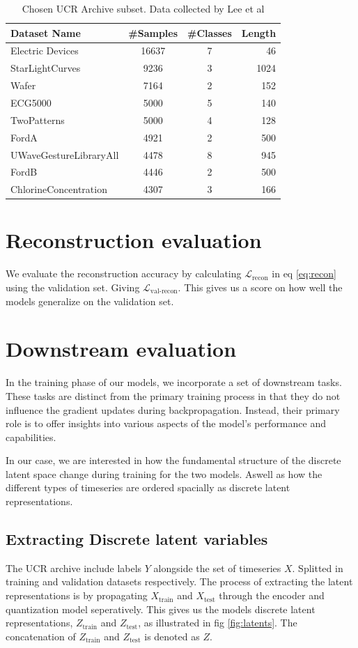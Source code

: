\begin{table}[h]
    \centering
    \begin{tabular}{l c c r}
    \hline
    Dataset Name & \#Samples & \#Classes & Length \\
    \hline
    Electric Devices & 16637 & 7 & 46 \\
    StarLightCurves & 9236 & 3 & 1024 \\
    Wafer & 7164 & 2 & 152\\
    ECG5000 & 5000 & 5 & 140 \\
    TwoPatterns & 5000 & 4 & 128 \\
    FordA & 4921 & 2 & 500 \\
    UWaveGestureLibraryAll & 4478 & 8 & 945 \\
    FordB & 4446 & 2 & 500 \\
    ChlorineConcentration & 4307 & 3 & 166
    \end{tabular}
    \caption{Chosen UCR Archive subset. Data collected by Lee et al\cite{SSLs}}
    \label{tab:sample_table}
\end{table}

\section{Reconstruction evaluation}
We evaluate the reconstruction accuracy by calculating $\mathcal{L}_\text{recon}$ in eq \ref{eq:recon} using the validation set. 
Giving $\mathcal{L}_\text{val-recon}$.
This gives us a score on how well the models generalize on the validation set.

\section{Downstream evaluation}
In the training phase of our models, we incorporate a set of downstream tasks. These tasks are distinct from the primary training process in that they do not influence the gradient updates during backpropagation. Instead, their primary role is to offer insights into various aspects of the model's performance and capabilities.

In our case, we are interested in how the fundamental structure of the discrete latent space change during training for the two models. Aswell as how the different types of timeseries are ordered spacially as discrete latent representations. 

\subsection{Extracting Discrete latent variables}
The UCR archive include labels $Y$ alongside the set of timeseries $X$. Splitted in training and validation datasets respectively. The process of extracting the latent representations is by propagating $X_\text{train}$ and $X_\text{test}$ through the encoder and quantization model seperatively. 
This gives us the models discrete latent representations, $Z_\text{train}$ and $Z_\text{test}$, as illustrated in fig \ref{fig:latents}. The concatenation of $Z_\text{train}$ and $Z_\text{test}$ is denoted as $Z$.

